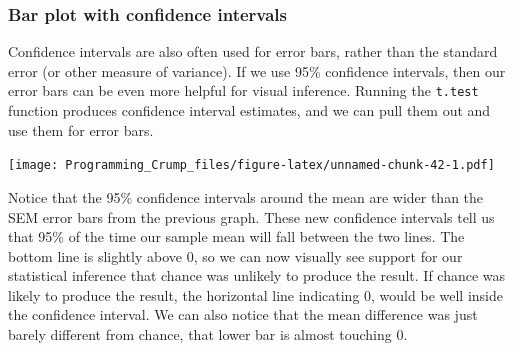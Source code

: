 \documentclass[]{book}
\newenvironment{Shaded}{\begin{snugshade}}{\end{snugshade}}
\newcommand{\KeywordTok}[1]{\textcolor[rgb]{0.13,0.29,0.53}{\textbf{{#1}}}}
\newcommand{\DataTypeTok}[1]{\textcolor[rgb]{0.13,0.29,0.53}{{#1}}}
\newcommand{\DecValTok}[1]{\textcolor[rgb]{0.00,0.00,0.81}{{#1}}}
\newcommand{\StringTok}[1]{\textcolor[rgb]{0.31,0.60,0.02}{{#1}}}
\newcommand{\NormalTok}[1]{{#1}}
\theoremstyle{definition}
\theoremstyle{definition}
\theoremstyle{definition}
\theoremstyle{remark}
\begin{document}
\subsubsection{Bar plot with confidence
intervals}\label{bar-plot-with-confidence-intervals}

Confidence intervals are also often used for error bars, rather than the
standard error (or other measure of variance). If we use 95\% confidence
intervals, then our error bars can be even more helpful for visual
inference. Running the \texttt{t.test} function produces confidence
interval estimates, and we can pull them out and use them for error
bars.

\begin{Shaded}
\end{Shaded}

\texttt{[image: Programming\_Crump\_files/figure-latex/unnamed-chunk-42-1.pdf]}

Notice that the 95\% confidence intervals around the mean are wider than
the SEM error bars from the previous graph. These new confidence
intervals tell us that 95\% of the time our sample mean will fall
between the two lines. The bottom line is slightly above 0, so we can
now visually see support for our statistical inference that chance was
unlikely to produce the result. If chance was likely to produce the
result, the horizontal line indicating 0, would be well inside the
confidence interval. We can also notice that the mean difference was
just barely different from chance, that lower bar is almost touching 0.
\end{document}
